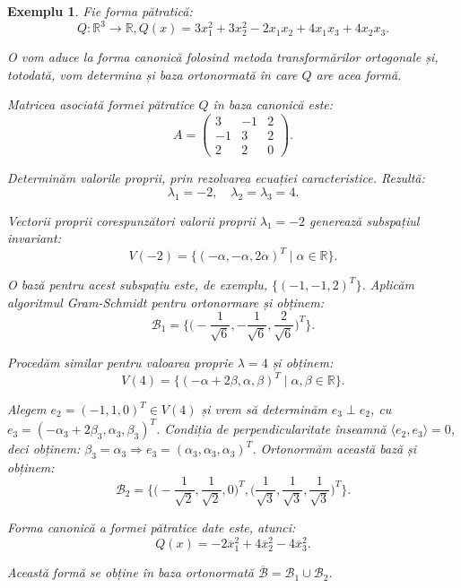 \documentclass[11pt,a4paper]{article}
\theoremstyle{dotless}
\theoremstyle{dotlessdr}
\newtheorem{example}{Exemplu}[section]
\begin{document}
\begin{example}
	Fie forma pătratică: 
 \[
	Q : \mathbb{R}^3 \to \mathbb{R}, 
	Q(x) = 3x_1^2 + 3x_2^2 - 2x_1 x_2 + 4x_1 x_3 + 4x_2 x_3.
\]

O vom aduce la forma canonică folosind metoda transformărilor ortogonale și,
totodată, vom determina și baza ortonormată în care $Q$ are acea formă.

Matricea asociată formei pătratice $Q$ în baza canonică este: 
 \[
	A = \begin{pmatrix}
	        3 & -1 & 2 \\
	        -1 & 3 & 2 \\
	        2 & 2 & 0
        \end{pmatrix}.
\]

Determinăm valorile proprii, prin rezolvarea ecuației caracteristice. Rezultă: 
 \[
	\lambda_1 = -2, \quad \lambda_2 = \lambda_3 = 4.
\]

Vectorii proprii corespunzători valorii proprii $\lambda_1 = -2$ generează
subspațiul invariant: 
 \[
	V(-2) = \{(-\alpha, -\alpha, 2 \alpha)^T \mid \alpha \in \mathbb{R} \}.
\]

O bază pentru acest subspațiu este, de exemplu, $\{(-1, -1, 2)^T\}$. Aplicăm
algoritmul Gram-Schmidt pentru ortonormare și obținem: 
 \[
	\mathcal{B}_1 = \Big\{ \Big( -\dfrac{1}{\sqrt{6}}, - \dfrac{1}{\sqrt{6}},
	\dfrac{2}{\sqrt{6}} \Big)^T \Big\}.
\]

Procedăm similar pentru valoarea proprie $\lambda = 4$ și obținem: 
 \[
	V(4) = \{(-\alpha + 2 \beta, \alpha, \beta)^T \mid \alpha, \beta 
	\in \mathbb{R} \}.
\]

Alegem $e_2 = (-1, 1, 0)^T \in V(4)$ și vrem să determinăm $e_3 \perp e_2$, cu
$e_3 = (- \alpha_3 + 2 \beta_3, \alpha_3, \beta_3)^T$. Condiția de 
perpendicularitate înseamnă $\langle e_2, e_3 \rangle = 0$, deci obținem:
$\beta_3 = \alpha_3 \Longrightarrow e_3 = (\alpha_3, \alpha_3, \alpha_3)^T$.
Ortonormăm această bază și obținem: 
 \[
	\mathcal{B}_2 = \Big\{ \Big( -\dfrac{1}{\sqrt{2}}, \dfrac{1}{\sqrt{2}}, 0
	 \Big)^T, \Big( \dfrac{1}{\sqrt{3}}, \dfrac{1}{\sqrt{3}}, 
	 \dfrac{1}{\sqrt{3}} \Big)^T \Big\}.
\]

Forma canonică a formei pătratice date este, atunci: 
 \[
	Q(x) = -2 \overline{x}_1^2 + 4\overline{x}_2^2 - 4 \overline{x}_3^2.
\]

Această formă se obține în baza ortonormată 
$\overline{\mathcal{B}} = \mathcal{B}_1 \cup \mathcal{B}_2$.
\end{example}
\end{document}
